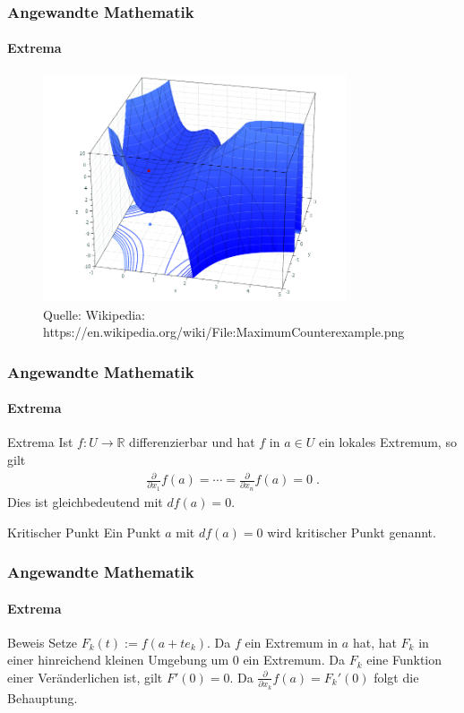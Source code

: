 \documentclass{beamer}
\begin{document}
\begin{frame}
    \frametitle{Angewandte Mathematik}
\framesubtitle{Extrema}

\begin{figure}[H]
      \centering
    \includegraphics[width=0.8\textwidth]{images/MaximumCounterexample}
      \caption{Quelle: Wikipedia: https://en.wikipedia.org/wiki/File:MaximumCounterexample.png}
\end{figure}
 \end{frame}



\begin{frame}
    \frametitle{Angewandte Mathematik}
\framesubtitle{Extrema}
    \begin{block}{Extrema}
 Ist $f: U  \to \mathbb{R}$ differenzierbar und hat  $f$ in $a \in U$ ein lokales Extremum, so gilt 
\begin{align*}
\frac{\partial}{\partial x_{1}} f(a) = \cdots  = \frac{\partial}{\partial x_{n}} f(a) = 0 \;.
\end{align*}
Dies ist gleichbedeutend mit $df(a) = 0$.
\end{block}
    \begin{block}{Kritischer Punkt}
 Ein Punkt $a$ mit $df(a) = 0$ wird kritischer Punkt genannt.
\end{block}

 \end{frame}

\begin{frame}
    \frametitle{Angewandte Mathematik}
\framesubtitle{Extrema}
    \begin{block}{Beweis}
Setze $F_k(t) := f(a + t e_k)$. Da $f$ ein Extremum in $a$ hat, hat $F_k$ in einer hinreichend kleinen Umgebung um $0$ ein Extremum. 
Da $F_k$ eine Funktion einer Veränderlichen ist, gilt $F'(0) = 0$. Da $\frac{\partial}{\partial x_k} f(a) = F_k'(0)$ folgt die Behauptung.
\end{block}
 \end{frame}
\end{document}
